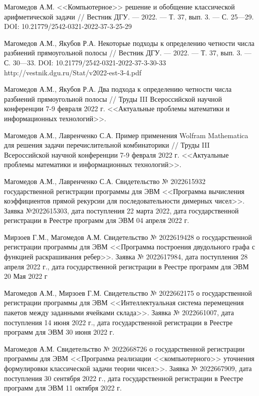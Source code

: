 \begin{thebibliography}{111}
Магомедов А.М.
<<Компьютерное>> решение и обобщение классической арифметической задачи
//
Вестник ДГУ.
--- 2022.
--- Т. 37, вып. 3.
--- С. 25---29.
DOI: 10.21779/2542-0321-2022-37-3-25-29

Магомедов А.М., Якубов Р.А.
Некоторые подходы к определению четности числа разбиений прямоугольной полосы
//
Вестник ДГУ.
--- 2022.
--- Т. 37, вып. 3.
--- С. 30---33.
DOI: 10.21779/2542-0321-2022-37-3-30-33
http://vestnik.dgu.ru/Stat/v2022-est-3-4.pdf

Магомедов А.М., Якубов Р.А.
Два подхода к определению четности числа разбиений прямоугольной полосы
//
Труды III Всероссийской научной конференции 7-9 февраля 2022 г. <<Актуальные проблемы математики и информационных технологий>>.

Магомедов А.М., Лавренченко С.А.
Пример применения Wolfram Mathematica для решения задачи перечислительной комбинаторики
//
Труды III Всероссийской научной конференции 7-9 февраля 2022 г.  <<Актуальные проблемы математики и информационных технологий>>.

Магомедов А.М., Лавренченко С.А.
Свидетельство № 2022615932 государственной регистрации программы для ЭВМ <<Программа вычисления коэффициентов прямой рекурсии для последовательности димерных чисел>>. Заявка №2022615303, дата поступления 22 марта 2022, дата государственной регистрации в Реестре программ для ЭВМ 04 апреля 2022 г.

Мирзоев Г.М., Магомедов А.М.
Свидетельство № 2022619428 о государственной регистрации программы для ЭВМ <<Программа построения двудольного графа с функцией раскрашивания ребер>>. Заявка № 2022617984, дата поступления 28 апреля 2022 г., дата государственной регистрации в Реестре программ для ЭВМ 20 Мая 2022 г

Магомедов А.М., Мирзоев Г.М.
Свидетельство № 2022662175 о государственной регистрации программы для ЭВМ <<Интеллектуальная система перемещения пакетов между заданными ячейками склада>>. Заявка № 2022661007, дата поступления 14 июня 2022 г., дата государственной регистрации в Реестре программ для ЭВМ 30 июня 2022 г.

Магомедов А.М.
Свидетельство № 2022668726 о государственной регистрации программы для ЭВМ <<Программа реализации <<компьютерного>> уточнения формулировки классической задачи теории чисел>>. Заявка № 2022667909, дата поступления 30 сентября 2022 г., дата государственной регистрации в Реестре программ для ЭВМ 11 октября 2022 г.


\end{thebibliography}
